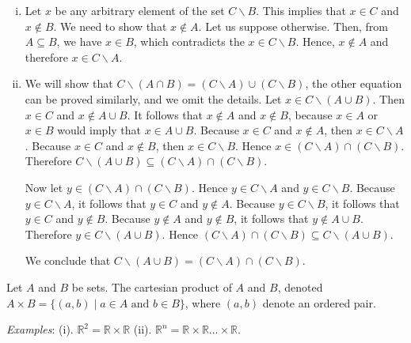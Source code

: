 \documentclass[a4paper,english,12pt]{article}
\newcommand{\Real}{\mathbb{R}}
\begin{document}
\begin{enumerate} [i)]
\item Let $x$ be any arbitrary element of the set $C \backslash B$. This implies that $x \in C$ and 
$x \notin B$. We need to show that $x \notin A$. Let us suppose otherwise. Then, from $A \subseteq B$, we have $x \in B$, which contradicts the $x \in C \backslash B$. Hence, $x \notin A$ and therefore $x \in C \backslash A$.     

\item We will show that $C \backslash (A \cap B) = (C \backslash A) \cup (C \backslash B)$, the other equation can be proved similarly, and we omit the details. Let $x \in C \backslash(A \cup B)$. 
Then $x \in C$ and $x \notin A \cup B$. It follows that $x \notin A$ and $x \notin  B$, because 
$x \in A$ or $x \in B$ would imply that $x \in A \cup B$. Because $x \in C$ and $x \notin A$, then $x \in C \backslash A$. Because $x \in C$ and $x \notin B$, then $x \in C \backslash B$. Hence $x \in (C \backslash A)\cap(C \backslash B)$. Therefore $C \backslash (A \cup B) \subseteq  (C \backslash A)\cap (C \backslash B)$.

Now let $y \in (C \backslash A) \cap (C \backslash B)$. Hence $y \in C \backslash A$ and $y \in C \backslash B$. Because $y \in C \backslash A$, it follows that $y \in C$ and $y \notin A$. Because $y \in C \backslash B$, it follows that $y \in C$ and $y \notin B$.
Because $y \notin A$ and $y \notin B$, it follows that $y \notin A \cup B$. Therefore $y  \in C \backslash (A \cup B)$. Hence $(C \backslash A) \cap (C \backslash B)  \subseteq C \backslash (A \cup B)$.

We conclude that $C \backslash (A \cup B) = (C \backslash A) \cap (C \backslash B)$.
 
\end{enumerate}



\begin{defn}
Let $A$ and $B$ be sets. The cartesian product of $A$ and $B$, denoted 
$A \times B = \{ (a, b) \; | \; a \in A \text{ and } b \in B \}$, 
where $(a, b)$ denote an ordered pair.
\end{defn}
\emph{Examples}: (i). $\Real^{2} = \Real \times \Real$ (ii). $\Real^{n} = \Real \times \Real \dots \times \Real$.
\end{document}
